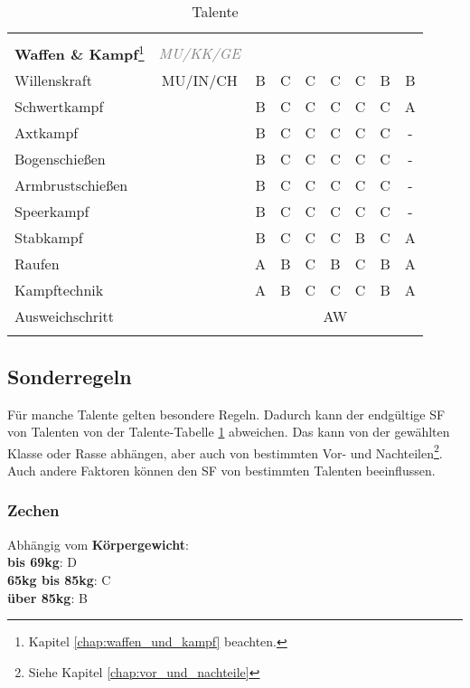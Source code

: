 \begin{center}
\begin{longtable}{|l|c|c|c|c|c|c|c|c|}
\hline
\multicolumn{9}{|l|}{} \\
\multicolumn{1}{|l}{\textbf{Waffen \& Kampf}\footnote{Kapitel \ref{chap:waffen_und_kampf} beachten.}} & \multicolumn{1}{c}{\textcolor{gray}{\textit{MU/KK/GE}}} & \multicolumn{7}{r|}{} \\
\hline
Willenskraft\footnotemark[3] & MU/IN/CH & B & C & C & C & C & B & B \\
\hline
Schwertkampf & & B & C & C & C & C & C & A \\
\hline
Axtkampf & & B & C & C & C & C & C & - \\
\hline
Bogenschießen & & B & C & C & C & C & C & - \\
\hline
Armbrustschießen & & B & C & C & C & C & C & - \\
\hline
Speerkampf & & B & C & C & C & C & C & - \\
\hline
Stabkampf\footnotemark[3] & & B & C & C & C & B & C & A \\
\hline
Raufen\footnotemark[3] & & A & B & C & B & C & B & A \\
\hline
Kampftechnik\footnotemark[3] & & A & B & C & C & C & B & A \\
\hline
Ausweichschritt\footnotemark[3] & & \multicolumn{7}{c|}{AW} \\

\hline
\caption{Talente}
\label{tab:Talente}
\end{longtable}
\end{center}

\subsection{Sonderregeln}
\label{chap:sonderregeln}
Für manche Talente gelten besondere Regeln. Dadurch kann der endgültige SF von Talenten von der Talente-Tabelle \ref{tab:Talente} abweichen. Das kann von der gewählten Klasse oder Rasse abhängen, aber auch von bestimmten Vor- und Nachteilen\footnote{Siehe Kapitel \ref{chap:vor_und_nachteile}}. Auch andere Faktoren können den SF von bestimmten Talenten beeinflussen.

\subsubsection{Zechen}
Abhängig vom \textbf{Körpergewicht}: \\
\textbf{bis 69kg}: D \\
\textbf{65kg bis 85kg}: C \\
\textbf{über 85kg}: B 

